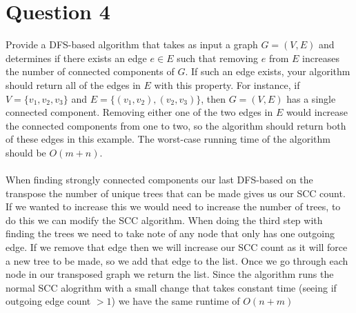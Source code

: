 \documentclass{article}
\begin{document}
\section*{Question 4}
Provide a DFS-based algorithm that takes as input a graph $G=(V,E)$ and determines if there exists an edge $e\in E$ such that removing $e$ from $E$ increases the number of connected components of $G$.
If such an edge exists, your algorithm should return all of the edges in $E$ with this property.
For instance, if $V=\{v_1, v_2, v_3\}$ and $E=\{(v_1, v_2), (v_2, v_3)\}$, then $G=(V,E)$ has a single connected component.
Removing either one of the two edges in $E$ would increase the connected components from one to two, so the algorithm should return both of these edges in this example.
The worst-case running time of the algorithm should be $O(m+n)$.
\\ \\
When finding strongly connected components our last DFS-based on the transpose the number of unique trees that can be made gives us our SCC count.
If we wanted to increase this we would need to increase the number of trees, to do this we can modify the SCC algorithm.
When doing the third step with finding the trees we need to take note of any node that only has one outgoing edge.
If we remove that edge then we will increase our SCC count as it will force a new tree to be made, so we add that edge to the list.
Once we go through each node in our transposed graph we return the list.
Since the algorithm runs the normal SCC alogrithm with a small change that takes constant time (seeing if outgoing edge count $> 1$) we have the same runtime of $O(n+m)$
\end{document}
